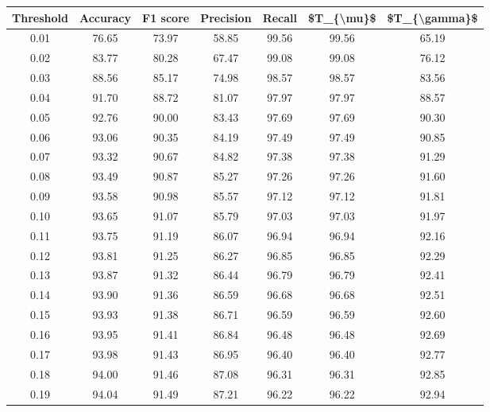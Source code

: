 \begin{tabular}{|c|c|c|c|c|c|c|}
\toprule
 Threshold &  Accuracy &  F1 score &  Precision &  Recall &  \$T\_\{\textbackslash mu\}\$ &  \$T\_\{\textbackslash gamma\}\$ \\
\hline
      0.01 &     76.65 &     73.97 &      58.85 &   99.56 &      99.56 &         65.19 \\
      0.02 &     83.77 &     80.28 &      67.47 &   99.08 &      99.08 &         76.12 \\
      0.03 &     88.56 &     85.17 &      74.98 &   98.57 &      98.57 &         83.56 \\
      0.04 &     91.70 &     88.72 &      81.07 &   97.97 &      97.97 &         88.57 \\
      0.05 &     92.76 &     90.00 &      83.43 &   97.69 &      97.69 &         90.30 \\
      0.06 &     93.06 &     90.35 &      84.19 &   97.49 &      97.49 &         90.85 \\
      0.07 &     93.32 &     90.67 &      84.82 &   97.38 &      97.38 &         91.29 \\
      0.08 &     93.49 &     90.87 &      85.27 &   97.26 &      97.26 &         91.60 \\
      0.09 &     93.58 &     90.98 &      85.57 &   97.12 &      97.12 &         91.81 \\
      0.10 &     93.65 &     91.07 &      85.79 &   97.03 &      97.03 &         91.97 \\
      0.11 &     93.75 &     91.19 &      86.07 &   96.94 &      96.94 &         92.16 \\
      0.12 &     93.81 &     91.25 &      86.27 &   96.85 &      96.85 &         92.29 \\
      0.13 &     93.87 &     91.32 &      86.44 &   96.79 &      96.79 &         92.41 \\
      0.14 &     93.90 &     91.36 &      86.59 &   96.68 &      96.68 &         92.51 \\
      0.15 &     93.93 &     91.38 &      86.71 &   96.59 &      96.59 &         92.60 \\
      0.16 &     93.95 &     91.41 &      86.84 &   96.48 &      96.48 &         92.69 \\
      0.17 &     93.98 &     91.43 &      86.95 &   96.40 &      96.40 &         92.77 \\
      0.18 &     94.00 &     91.46 &      87.08 &   96.31 &      96.31 &         92.85 \\
      0.19 &     94.04 &     91.49 &      87.21 &   96.22 &      96.22 &         92.94 \\

\end{tabular}
